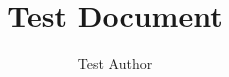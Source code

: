 \documentclass{report}
\title{Test Document}
\author{Test Author}
\begin{document}
\maketitle
\tableofcontents










\printunsrtglossaries
\end{document}
